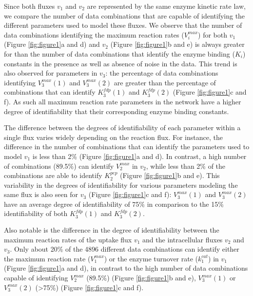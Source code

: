 \documentclass[10pt]{article}
\begin{document}
Since both fluxes $v_1$ and $v_2$ are represented by the same enzyme kinetic rate law, we compare the number of data combinations that are capable of identifying the different parameters used to model these fluxes. We observe that the number of data combinations identifying the maximum reaction rates ($V_i^{max}$) for both $v_1$ (Figure \ref{fig:figure1}a and d) and $v_2$ (Figure \ref{fig:figure1}b and e) is always greater for than the number of data combinations that identify the enzyme binding ($K_i$) constants in the presence as well as absence of noise in the data. This trend is also observed for parameters in $v_3$: the percentage of data combinations identifying $V_3^{max} (1)$ and $V_3^{max}(2)$ are greater than the percentage of combinations that can identify $K_3^{fdp}(1)$ and $K_3^{fdp}(2)$ (Figure \ref{fig:figure1}c and f). As such all maximum reaction rate parameters in the network have a higher degree of identifiability that their corresponding enzyme binding constants.

The difference between the degrees of identifiability of each parameter within a single flux varies widely depending on the reaction flux. For instance, the difference in the number of combinations that can identify the parameters used to model $v_1$ is less than 2\% (Figure \ref{fig:figure1}a and d). In contrast, a high number of combinations (89.5\%) can identify $V_2^{max}$ in $v_2$, while less than 2\% of the combinations are able to identify $K_2^{pep}$ (Figure \ref{fig:figure1}b and e). This variability in the degrees of identifiability for various parameters modeling the same flux is also seen for $v_3$ (Figure \ref{fig:figure1}c and f): $V_3^{max} (1)$ and $V_3^{max} (2)$ have an average degree of identifiability of 75\% in comparison to the 15\% identifiability of both $K_3^{fdp} (1)$ and $K_3^{fdp} (2)$. 

Also notable is the difference in the degree of identifiability between the maximum reaction rates of the uptake flux $v_1$ and the intracellular fluxes $v_2$ and $v_3$. Only about 20\% of the 4896 different data combinations can identify either the maximum reaction rate ($V_1^{max}$) or the enzyme turnover rate ($k_1^{cat}$) in $v_1$ (Figure \ref{fig:figure1}a and d), in contrast to the high number of data combinations capable of identifying $V_2^{max}$ (89.5\%) (Figure \ref{fig:figure1}b and e), $V_3^{max} (1)$ or $V_3^{max} (2)$ (>75\%) (Figure \ref{fig:figure1}c and f). 
\end{document}
